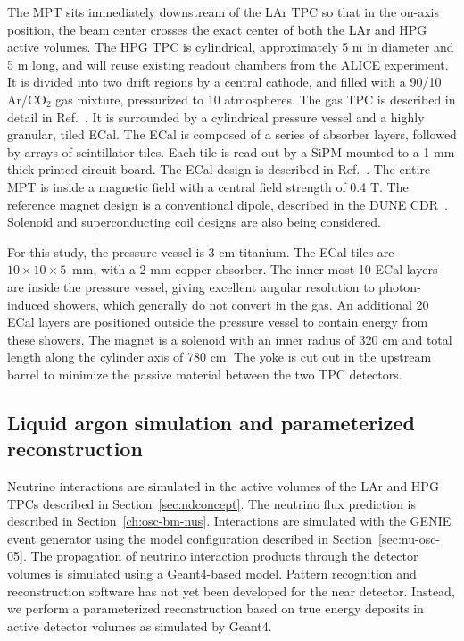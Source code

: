 The MPT sits immediately downstream of the LAr TPC so that in the on-axis position, the beam center crosses the exact center of both the LAr and HPG active volumes. The HPG TPC is cylindrical, approximately 5 m in diameter and 5 m long, and will reuse existing readout chambers from the ALICE experiment. It is divided into two drift regions by a central cathode, and filled with a 90/10 Ar/CO$_{2}$ gas mixture, pressurized to 10 atmospheres. The gas TPC is described in detail in Ref.~\cite{gasTPC}.  It is surrounded by a cylindrical pressure vessel and a highly granular, tiled ECal. The ECal is composed of a series of absorber layers, followed by arrays of scintillator tiles. Each tile is read out by a SiPM mounted to a 1 mm thick printed circuit board. The ECal design is described in Ref.~\cite{CALICEecal}. The entire MPT is inside a magnetic field with a central field strength of 0.4 T. The reference magnet design is a conventional dipole, described in the DUNE CDR~\cite{cdr-vol-4}. Solenoid and superconducting coil designs are also being considered.

For this study, the pressure vessel is 3 cm titanium. The ECal tiles are $10 \times 10 \times 5$~mm, with a 2 mm copper absorber. The inner-most 10 ECal layers are inside the pressure vessel, giving excellent angular resolution to photon-induced showers, which generally do not convert in the gas. An additional 20 ECal layers are positioned outside the pressure vessel to contain energy from these showers. The magnet is a solenoid with an inner radius of 320 cm and total length along the cylinder axis of 780 cm. The yoke is cut out in the upstream barrel to minimize the passive material between the two TPC detectors.

\subsection{Liquid argon simulation and parameterized reconstruction}
\label{sec:larndsimreco}

Neutrino interactions are simulated in the active volumes of the LAr and HPG TPCs described in Section~\ref{sec:ndconcept}. The neutrino flux prediction is described in Section~\ref{ch:osc-bm-nus}.%
Interactions are simulated with the GENIE event generator using the model configuration described in Section~\ref{sec:nu-osc-05}. The propagation of neutrino interaction products through the detector volumes is simulated using a Geant4-based model. Pattern recognition and reconstruction software has not yet been developed for the near detector. Instead, we perform a parameterized reconstruction based on true energy deposits in active detector volumes as simulated by Geant4.

